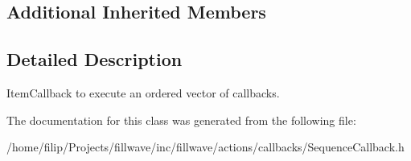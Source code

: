 \subsection*{Additional Inherited Members}


\subsection{Detailed Description}
Item\+Callback to execute an ordered vector of callbacks. 

The documentation for this class was generated from the following file\+:\begin{DoxyCompactItemize}
\item 
/home/filip/\+Projects/fillwave/inc/fillwave/actions/callbacks/Sequence\+Callback.\+h\end{DoxyCompactItemize}
